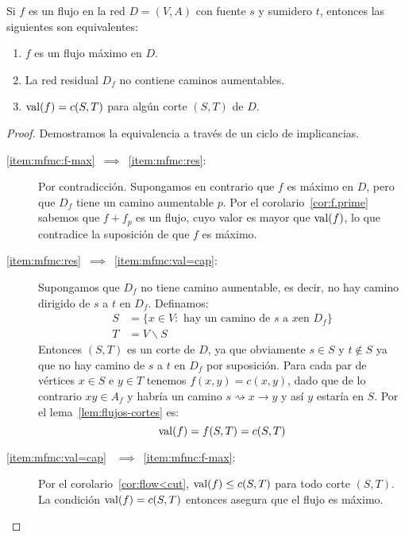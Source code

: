  \begin{theorem}
    \label{theo:max-flow=min-cut}
    Si \(f\) es un flujo en la red \(D = (V, A)\)
    con fuente \(s\) y sumidero \(t\),
    entonces las siguientes son equivalentes:
    \begin{enumerate}[label=(\arabic{*})]
    \item\label{item:mfmc:f-max}
      \(f\) es un flujo máximo en \(D\).
    \item\label{item:mfmc:res}
      La red residual \(D_f\) no contiene
      caminos aumentables.
    \item\label{item:mfmc:val=cap}
      \(\operatorname{val}(f) = c(S, T)\) para algún corte \((S, T)\) de \(D\).
    \end{enumerate}
  \end{theorem}
  \begin{proof}
    Demostramos la equivalencia
    a través de un ciclo de implicancias.%
    \begin{description}
    \item[\boldmath
	  \ref{item:mfmc:f-max}~\(\implies\)~\ref{item:mfmc:res}:
	  \unboldmath]
      Por contradicción.
      Supongamos en contrario que \(f\) es máximo en \(D\),
      pero que \(D_f\)
      tiene un camino aumentable \(p\).
      Por el corolario~\ref{cor:f.prime}
      sabemos que \(f + f_p\) es un flujo,
      cuyo valor es mayor que \(\operatorname{val}(f)\),
      lo que contradice la suposición de que \(f\) es máximo.
    \item[\boldmath
	  \ref{item:mfmc:res}~\(\implies\)~\ref{item:mfmc:val=cap}:
	  \unboldmath]
      Supongamos que \(D_f\)
      no tiene camino aumentable,
      es decir,
      no hay camino dirigido de \(s\) a \(t\) en \(D_f\).
      Definamos:
      \begin{align*}
	S & = \{x \in V \colon
		  \text{\ hay un camino de \(s\) a \(x\)
			en \(D_f\)\}} \\
	T & = V \smallsetminus S
      \end{align*}
      Entonces \((S, T)\) es un corte de \(D\),
      ya que obviamente \(s \in S\) y \(t \notin S\)
      ya que no hay camino de \(s\) a \(t\) en \(D_f\)
      por suposición.
      Para cada par de vértices \(x \in S\) e \(y \in T\) tenemos
      \(f(x, y) = c(x, y)\),
      dado que de lo contrario \(x y \in A_f\) y habría un camino
      \(s \rightsquigarrow x \rightarrow y\)
      y así \(y\) estaría en \(S\).
      Por el lema~\ref{lem:flujos-cortes} es:
      \begin{equation*}
	\operatorname{val}(f)
	  = f(S, T)
	  = c(S, T)
      \end{equation*}
    \item[\boldmath
	  \ref{item:mfmc:val=cap}~%
	     \(\implies\)~\ref{item:mfmc:f-max}:
	  \unboldmath]
      Por el corolario~\ref{cor:flow<cut},
      \(\operatorname{val}(f) \le c(S, T)\) para todo corte \((S, T)\).
      La condición \(\operatorname{val}(f) = c(S, T)\)
      entonces asegura que el flujo es máximo.
    \qedhere
    \end{description}
  \end{proof}

